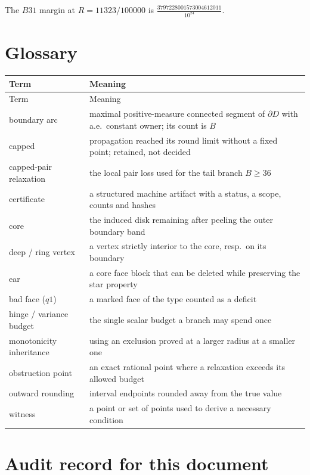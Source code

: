 The $B31$ margin at $R=11323/100000$ is $\frac{3797228001573004612011}{10^{24}}$.


\section{Glossary}

{\footnotesize
\begin{longtable}{@{}>{\raggedright\arraybackslash}p{}>{\raggedright\arraybackslash}p{}@{}}
\toprule
Term & Meaning \\
\midrule
\endfirsthead
\toprule
Term & Meaning \\
\midrule
\endhead
\bottomrule
\endlastfoot
boundary arc & maximal positive-measure connected segment of $\partial D$ with a.e.\ constant owner;
its count is $B$ \\
capped & propagation reached its round limit without a fixed point; retained, not decided \\
capped-pair relaxation & the local pair loss used for the tail branch $B\ge36$ \\
certificate & a structured machine artifact with a status, a scope, counts and hashes \\
core & the induced disk remaining after peeling the outer boundary band \\
deep / ring vertex & a vertex strictly interior to the core, resp.\ on its boundary \\
ear & a core face block that can be deleted while preserving the star property \\
bad face ($q1$) & a marked face of the type counted as a deficit \\
hinge / variance budget & the single scalar budget a branch may spend once \\
monotonicity inheritance & using an exclusion proved at a larger radius at a smaller one \\
obstruction point & an exact rational point where a relaxation exceeds its allowed budget \\
outward rounding & interval endpoints rounded away from the true value \\
witness & a point or set of points used to derive a necessary condition \\
\end{longtable}}


\section{Audit record for this document}

